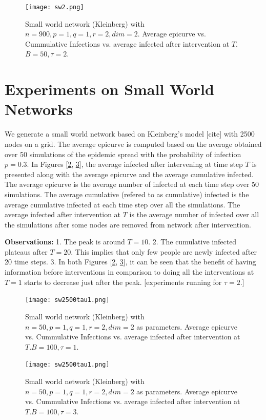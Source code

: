 \begin{figure}[!h]
    \centering
    \texttt{[image: sw2.png]}
    \caption{Small world network (Kleinberg) with $n = 900,p =1, q =1, r =2, dim = 2$. Average epicurve vs. Cummulative Infections vs. average infected after intervention at $T$.$B = 50, \tau = 2$.}
    \label{fig:sw2}
\end{figure}

\section{Experiments on Small World Networks}
We generate a small world network based on Kleinberg's model [cite] with 2500 nodes on a grid. The average epicurve is computed based on the average obtained over 50 simulations of the epidemic spread with the probability of infection $p = 0.3$. In Figures [\ref{fig:sw2500tau1}, \ref{fig:sw2500tau3}], the average infected after intervening at time step $T$ is presented along with the average epicurve and the average cumulative infected. The average epicurve is the average number of infected at each time step over 50 simulations. The average cumulative (refered to as cumulative) infected is the average cumulative infected at each time step over all the simulations. The average infected after intervention at $T$ is the average number of infected over all the simulations after some nodes are removed from network after intervention. 

\textbf{Observations:}
1. The peak is around $T = 10$.
2. The cumulative infected plateaus after $T = 20$. This implies that only few people are newly infected after 20 time steps.
3. In both Figures [\ref{fig:sw2500tau1}, \ref{fig:sw2500tau3}], it can be seen that the benefit of having information before interventions in comparison to doing all the interventions at $T=1$ starts to decrease just after the peak. [experiments running for $\tau = 2$.] 
\begin{figure}[!ht]
    \centering
    \texttt{[image: sw2500tau1.png]}
    \caption{Small world network (Kleinberg) with $n = 50,p =1, q =1, r =2, dim = 2$ as parameters. Average epicurve vs. Cummulative Infections vs. average infected after intervention at $T$.$B = 100, \tau = 1$.}
    \label{fig:sw2500tau1}
\end{figure}

\begin{figure}[!ht]
    \centering
    \texttt{[image: sw2500tau1.png]}
    \caption{Small world network (Kleinberg) with $n = 50,p =1, q =1, r =2, dim = 2$ as parameters. Average epicurve vs. Cummulative Infections vs. average infected after intervention at $T$.$B = 100, \tau = 3$.}
    \label{fig:sw2500tau3}
\end{figure}
